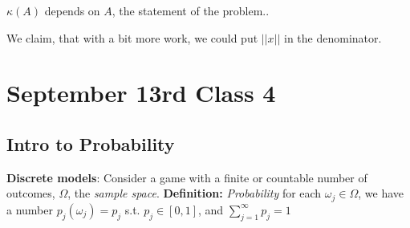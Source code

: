 $\kappa(A)$ depends on $A$, the statement of the problem.. 

We claim, that with a bit more work, we could put $||x||$ in the denominator. 
\pagebreak
\section{September 13rd Class 4}
\label{sec:class4}
\subsection{Intro to Probability}
\label{sec:probability}

\textbf{Discrete models}: Consider a game with a finite or countable
number of outcomes, $\Omega$, the \emph{sample space}.
\textbf{Definition:} \emph{Probability} for each $\omega_j \in
\Omega$, we have a number $p_j(\omega_j) = p_j$ s.t. $p_j \in [0, 1]$,
and $\sum_{j=1}^{\infty} p_j = 1$

